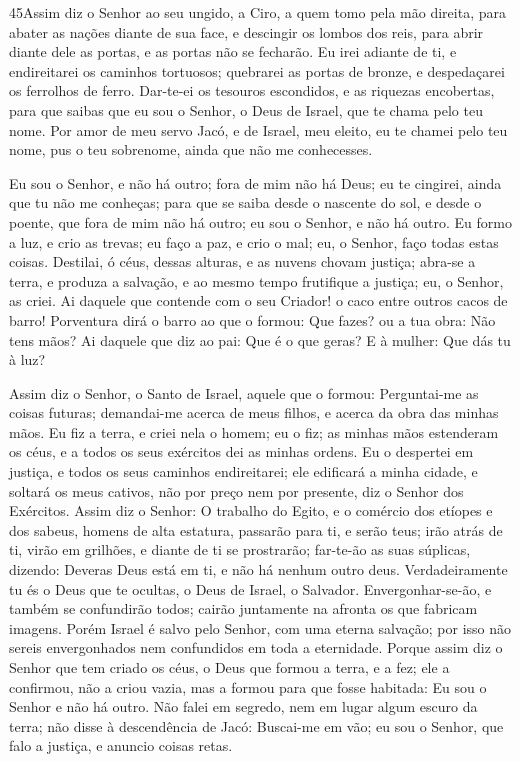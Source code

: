 \medskip

\lettrine{45}{}Assim diz o Senhor ao seu ungido, a Ciro, a quem
tomo pela mão direita, para abater as nações diante de sua face, e
descingir os lombos dos reis, para abrir diante dele as portas, e as
portas não se fecharão. Eu irei adiante de ti, e endireitarei os
caminhos tortuosos; quebrarei as portas de bronze, e despedaçarei os
ferrolhos de ferro. Dar-te-ei os tesouros escondidos, e as
riquezas encobertas, para que saibas que eu sou o Senhor, o Deus de
Israel, que te chama pelo teu nome. Por amor de meu servo Jacó,
e de Israel, meu eleito, eu te chamei pelo teu nome, pus o teu
sobrenome, ainda que não me conhecesses.

Eu sou o Senhor, e não há outro; fora de mim não há Deus; eu te
cingirei, ainda que tu não me conheças; para que se saiba desde
o nascente do sol, e desde o poente, que fora de mim não há outro;
eu sou o Senhor, e não há outro. Eu formo a luz, e crio as
trevas; eu faço a paz, e crio o mal; eu, o Senhor, faço todas estas
coisas. Destilai, ó céus, dessas alturas, e as nuvens chovam
justiça; abra-se a terra, e produza a salvação, e ao mesmo tempo
frutifique a justiça; eu, o Senhor, as criei. Ai daquele que
contende com o seu Criador! o caco entre outros cacos de barro!
Porventura dirá o barro ao que o formou: Que fazes? ou a tua obra:
Não tens mãos? Ai daquele que diz ao pai: Que é o que geras?
E à mulher: Que dás tu à luz?

Assim diz o Senhor, o Santo de Israel, aquele que o formou:
Perguntai-me as coisas futuras; demandai-me acerca de meus filhos, e
acerca da obra das minhas mãos. Eu fiz a terra, e criei nela
o homem; eu o fiz; as minhas mãos estenderam os céus, e a todos os
seus exércitos dei as minhas ordens. Eu o despertei em
justiça, e todos os seus caminhos endireitarei; ele edificará a
minha cidade, e soltará os meus cativos, não por preço nem por
presente, diz o Senhor dos Exércitos. Assim diz o Senhor: O
trabalho do Egito, e o comércio dos etíopes e dos sabeus, homens de
alta estatura, passarão para ti, e serão teus; irão atrás de ti,
virão em grilhões, e diante de ti se prostrarão; far-te-ão as suas
súplicas, dizendo: Deveras Deus está em ti, e não há nenhum outro
deus. Verdadeiramente tu és o Deus que te ocultas, o Deus de
Israel, o Salvador. Envergonhar-se-ão, e também se
confundirão todos; cairão juntamente na afronta os que fabricam
imagens. Porém Israel é salvo pelo Senhor, com uma eterna
salvação; por isso não sereis envergonhados nem confundidos em toda
a eternidade. Porque assim diz o Senhor que tem criado os
céus, o Deus que formou a terra, e a fez; ele a confirmou, não a
criou vazia, mas a formou para que fosse habitada: Eu sou o Senhor e
não há outro. Não falei em segredo, nem em lugar algum escuro
da terra; não disse à descendência de Jacó: Buscai-me em vão; eu sou
o Senhor, que falo a justiça, e anuncio coisas retas.

